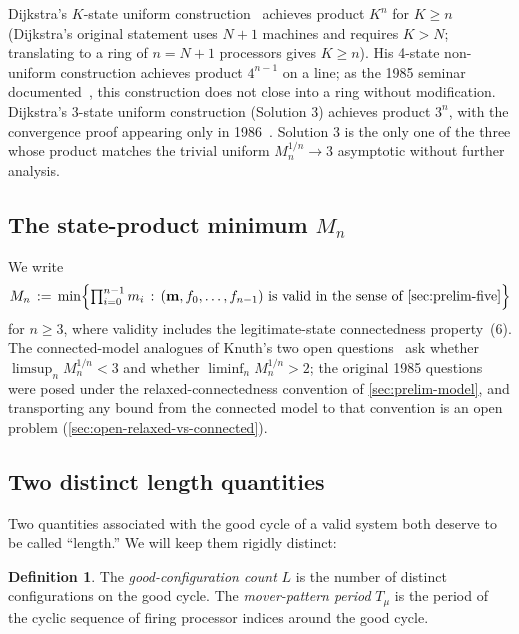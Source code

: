 \documentclass[11pt,a4paper]{article}
\theoremstyle{plain}
\theoremstyle{definition}
\newtheorem{definition}[theorem]{Definition}
\newcommand{\Mn}{M_n}
\begin{document}
Dijkstra's $K$-state uniform construction~\cite{Dijkstra1974} achieves
product $K^n$ for $K \ge n$ (Dijkstra's original statement uses $N+1$
machines and requires $K > N$; translating to a ring of $n = N + 1$
processors gives $K \ge n$).  His 4-state non-uniform construction
achieves product $4^{n-1}$ on a line; as the 1985 seminar
documented~\cite[p.~76]{HaddadKnuth1985}, this construction does not
close into a ring without modification.  Dijkstra's 3-state uniform
construction (Solution 3) achieves product $3^n$, with the convergence
proof appearing only in 1986~\cite{Dijkstra1986}.  Solution 3 is the
only one of the three whose product matches the trivial uniform
$\Mn^{1/n} \to 3$ asymptotic without further analysis.

\subsection{The state-product minimum $\Mn$}\label{sec:prelim-Mn}

We write
\[
   \Mn \,:=\, \min \Bigl\{ \textstyle\prod_{i=0}^{n-1} m_i \,:\, (\mathbf{m}, f_0, \ldots, f_{n-1}) \text{ is valid in the sense of \cref{sec:prelim-five}} \Bigr\}
\]
for $n \ge 3$, where validity includes the legitimate-state
connectedness property~(6).  The connected-model analogues of
Knuth's two open questions~\cite[p.~68]{HaddadKnuth1985} ask whether
$\limsup_n \Mn^{1/n} < 3$ and whether $\liminf_n \Mn^{1/n} > 2$; the
original 1985 questions were posed under the relaxed-connectedness
convention of \cref{sec:prelim-model}, and transporting any bound
from the connected model to that convention is an open problem
(\cref{sec:open-relaxed-vs-connected}).

\subsection{Two distinct length quantities}\label{sec:prelim-lengths}

Two quantities associated with the good cycle of a valid system both
deserve to be called ``length.''  We will keep them rigidly distinct:

\begin{definition}\label{def:lengths}
The \emph{good-configuration count} $L$ is the number of distinct
configurations on the good cycle.  The \emph{mover-pattern period}
$T_\mu$ is the period of the cyclic sequence of firing processor
indices around the good cycle.
\end{definition}
\end{document}
